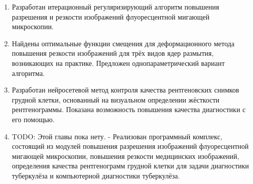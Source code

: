 \begin {enumerate}
	\item Разработан итерационный регуляризирующий алгоритм повышения разрешения и резкости изображений флуоресцентной мигающей микроскопии.
	\item Найдены оптимальные функции смещения для деформационного метода повышения резкости изображений для трёх видов ядер размытия, возникающих на практике. Предложен однопараметрический вариант алгоритма.
	\item Разработан нейросетевой метод контроля качества рентгеновских снимков грудной клетки, основанный на визуальном определении жёсткости рентгенограммы. Показана возможность повышения качества диагностики с его помощью.
	\item TODO: Этой главы пока нету. - Реализован программный комплекс, состоящий из модулей повышения разрешения изображений флуоресцентной мигающей микроскопии, повышения резкости медицинских изображений, определения качества рентгенограмм грудной клетки для задачи диагностики туберкулёза и компьютерной диагностики туберкулёза.
\end {enumerate}

